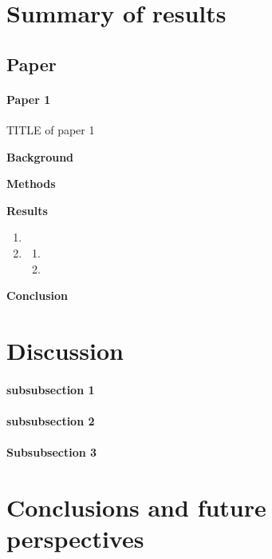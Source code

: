 \documentclass[]{uiophd}
\begin{document}
\chapter{Summary of results}

\section{Paper }
\subsubsection*{Paper 1} TITLE of paper 1

\noindent \textbf{Background} 
\lipsum[31]

\medbreak
\noindent \textbf{Methods} 
\lipsum[32]

\medbreak
\noindent  \textbf{Results}
\begin{enumerate} [nolistsep]
	\setlength{\itemsep}{3pt}
	\setlength{\parsep}{0pt}
	
	\item \lipsum[42]
	
	\item  \lipsum[43]
	
	\begin{enumerate}
		\item \lipsum[43]
		\item \lipsum[44]
	\end{enumerate}
	
\end{enumerate}

\medbreak
\noindent  \textbf{Conclusion} \lipsum[41]




\chapter{Discussion}

\subsubsection*{subsubsection 1} 
\lipsum[61] %

\subsubsection*{subsubsection 2} 
\lipsum[62] %

\subsubsection*{Subsubsection 3}
\lipsum[63] %


\chapter{Conclusions  and future perspectives }

\lipsum[50-56] %




%
{\scriptsize }
\end{document}
